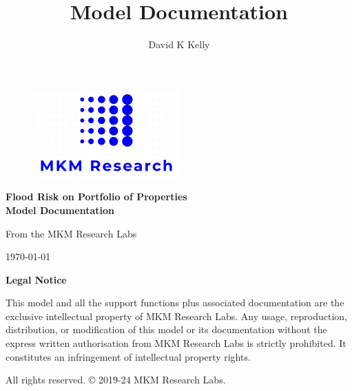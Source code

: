 \documentclass{article}
\title{Model Documentation}
\author{David K Kelly}
\date{}
\begin{document}
\begin{titlepage}
\begin{center}

\begin{figure}
	\centering
	\includegraphics[width=0.5\textwidth]{MKM.jpeg}
\end{figure}

\vspace{2cm}

{\Huge\bfseries Flood Risk on Portfolio of Properties\\Model Documentation\par}

\vspace{2cm}

{\Large From the MKM Research Labs\par}

\vspace{1cm}

{\large \today\par}

\end{center}
\end{titlepage}
\newpage

\tableofcontents

\newpage
\begin{center}
\large\textbf{Legal Notice}



\vspace{2em}

\noindent This model and all the support functions plus associated documentation are the exclusive intellectual property of MKM Research Labs. Any usage, reproduction, distribution, or modification of this model or its documentation without the express written authorisation from MKM Research Labs is strictly prohibited.   It constitutes an infringement of intellectual property rights. 

\vspace{1em}

\noindent All rights reserved. © 2019-24 MKM Research Labs.

\vspace{2em}
\end{center}
\clearpage
\end{document}
